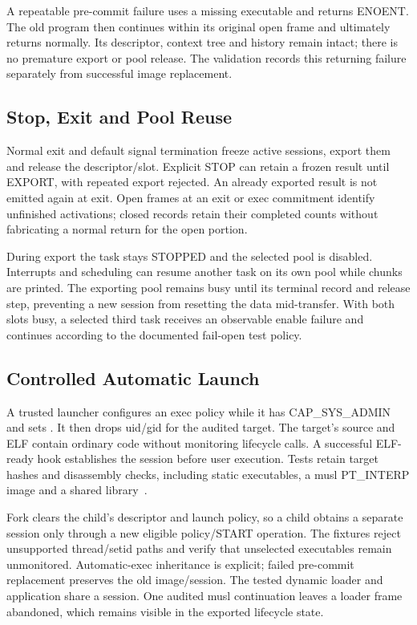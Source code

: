 A repeatable pre-commit failure uses a missing executable and returns ENOENT. The old program then continues within its original open frame and ultimately returns normally. Its descriptor, context tree and history remain intact; there is no premature export or pool release. The validation records this returning failure separately from successful image replacement.

\subsection{Stop, Exit and Pool Reuse}
Normal exit and default signal termination freeze active sessions, export them and release the descriptor/slot. Explicit STOP can retain a frozen result until EXPORT, with repeated export rejected. An already exported result is not emitted again at exit. Open frames at an exit or exec commitment identify unfinished activations; closed records retain their completed counts without fabricating a normal return for the open portion.

During export the task stays STOPPED and the selected pool is disabled. Interrupts and scheduling can resume another task on its own pool while chunks are printed. The exporting pool remains busy until its terminal record and release step, preventing a new session from resetting the data mid-transfer. With both slots busy, a selected third task receives an observable enable failure and continues according to the documented fail-open test policy.

\subsection{Controlled Automatic Launch}
A trusted launcher configures an exec policy while it has CAP\_SYS\_ADMIN and sets . It then drops uid/gid for the audited target. The target's source and ELF contain ordinary code without monitoring lifecycle calls. A successful ELF-ready hook establishes the session before user execution. Tests retain target hashes and disassembly checks, including static executables, a musl PT\_INTERP image and a shared library~\citep{musl}.

Fork clears the child's descriptor and launch policy, so a child obtains a separate session only through a new eligible policy/START operation. The fixtures reject unsupported thread/setid paths and verify that unselected executables remain unmonitored. Automatic-exec inheritance is explicit; failed pre-commit replacement preserves the old image/session. The tested dynamic loader and application share a session. One audited musl continuation leaves a loader frame abandoned, which remains visible in the exported lifecycle state.

